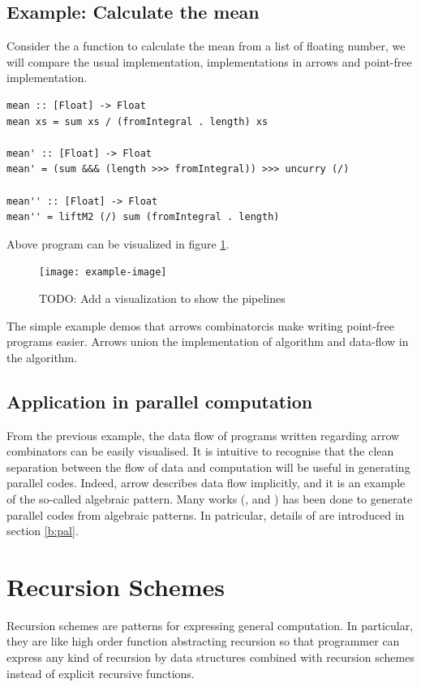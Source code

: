 \subsection{Example: Calculate the mean}
Consider the a function to calculate the mean from a list of floating number, we will compare the usual implementation, implementations in arrows and point-free implementation.
\begin{verbatim}
mean :: [Float] -> Float
mean xs = sum xs / (fromIntegral . length) xs

mean' :: [Float] -> Float
mean' = (sum &&& (length >>> fromIntegral)) >>> uncurry (/)

mean'' :: [Float] -> Float
mean'' = liftM2 (/) sum (fromIntegral . length)
\end{verbatim}
Above program can be visualized in figure \ref{b:ar:p2}.
\begin{figure}[ht]
  \centering
  \texttt{[image: example-image]} 
  \caption{TODO: Add a visualization to show the pipelines}\label{b:ar:p2}
\end{figure}
The simple example demos that arrows combinatorcis make writing point-free programs easier. Arrows union the implementation of algorithm and data-flow in the algorithm. 

\subsection{Application in parallel computation}
From the previous example, the data flow of programs written regarding arrow combinators can be easily visualised. It is intuitive to recognise that the clean separation between the flow of data and computation will be useful in generating parallel codes. Indeed, arrow describes data flow implicitly, and it is an example of the so-called algebraic pattern. Many works (\cite{braunArrowsParallelComputation2018}, \cite{elliottGenericFunctionalParallel2017b} and \cite{authorAlgebraicMultipartyProtocol2018}) has been done to generate parallel codes from algebraic patterns.
In patricular, details of \cite{authorAlgebraicMultipartyProtocol2018} are introduced in section \ref{b:pal}.

\section{Recursion Schemes} \label{b:rs}
Recursion schemes are patterns for expressing general computation. In particular, they are like high order function abstracting recursion so that programmer can express any kind of recursion by data structures combined with recursion schemes instead of explicit recursive functions.
